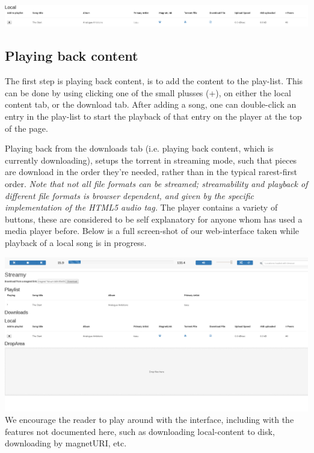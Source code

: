\includegraphics[width=\linewidth]{gfx/local-info}

\subsection{Playing back content}
The first step is playing back content, is to add the content to the play-list.
This can be done by using clicking one of the small plusses (+), on either the
local content tab, or the download tab.
\newline
After adding a song, one can double-click an entry in the play-list to start the
playback of that entry on the player at the top of the page.

Playing back from the downloads tab (i.e. playing back content, which is
currently downloading), setups the torrent in streaming mode, such that pieces
are download in the order they're needed, rather than in the typical
rarest-first order.
{\em Note that not all file formats can be streamed; streamability and playback
of different file formats is browser dependent, and given by the specific
implementation of the \acs{HTML}5 audio tag.}
\newline\newline
The player contains a variety of buttons, these are considered to be self
explanatory for anyone whom has used a media player before. Below is a full
screen-shot of our web-interface taken while playback of a local song is in
progress.

\includegraphics[width=\linewidth]{gfx/interface}
\newline
We encourage the reader to play around with the interface, including with the
features not documented here, such as downloading local-content to disk,
downloading by magnetURI, etc.
